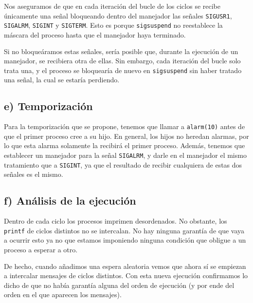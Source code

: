 \documentclass{article}
\begin{document}
Nos aseguramos de que en cada iteración del bucle de los ciclos se recibe únicamente una señal bloqueando dentro del manejador las señales \texttt{SIGUSR1}, \texttt{SIGALRM}, \texttt{SIGINT} y \texttt{SIGTERM}. Esto es porque \texttt{sigsuspend} no reestablece la máscara del proceso hasta que el manejador haya terminado. 

Si no bloqueáramos estas señales, sería posible que, durante la ejecución de un manejador, se recibiera otra de ellas. Sin embargo, cada iteración del bucle solo trata una, y el proceso se bloquearía de nuevo en \texttt{sigsuspend} sin haber tratado una señal, la cual se estaría perdiendo.


\subsection*{e) Temporización}

Para la temporización que se propone, tenemos que llamar a \texttt{alarm(10)} antes de que el primer proceso cree a su hijo. En general, los hijos no heredan alarmas, por lo que esta alarma solamente la recibirá el primer proceso. Además, tenemos que establecer un manejador para la señal \texttt{SIGALRM}, y darle en el manejador el mismo tratamiento que a \texttt{SIGINT}, ya que el resultado de recibir cualquiera de estas dos señales es el mismo. 

\subsection*{f) Análisis de la ejecución}

Dentro de cada ciclo los procesos imprimen desordenados. No obstante, los \texttt{printf} de ciclos distintos no se intercalan. No hay ninguna garantía de que vaya a ocurrir esto ya no que estamos imponiendo ninguna condición que obligue a un proceso a esperar a otro. 

De hecho, cuando añadimos una espera aleatoria vemos que ahora sí se empiezan a intercalar mensajes de ciclos distintos. Con esta nueva ejecución confirmamos lo dicho de que no había garantía alguna del orden de ejecución (y por ende del orden en el que aparecen los mensajes).


\end{document}

